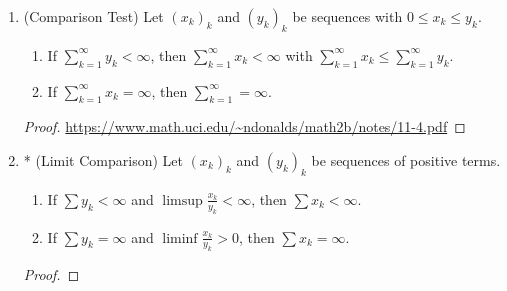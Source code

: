 \begin{enumerate}[label = (\arabic*)]
        \item (Comparison Test) Let $(x_k)_k$ and $(y_k)_k$ be sequences with $0 \leq x_k \leq y_k$.
            \begin{enumerate}[label = (\roman*)]
                \item If $\sum_{k=1}^\infty y_k < \infty$, then $\sum_{k = 1}^\infty x_k < \infty$ with $\sum_{k = 1}^\infty x_k \leq \sum_{k = 1}^\infty y_k$.
                \item If $\sum_{k = 1}^\infty x_k = \infty$, then $\sum_{k=1}^\infty = \infty$.
            \end{enumerate}
            {\color{red} \begin{proof}
                \url{https://www.math.uci.edu/~ndonalds/math2b/notes/11-4.pdf}
            \end{proof}}
        
        \item * (Limit Comparison) Let $(x_k)_k$ and $(y_k)_k$ be sequences of positive terms.
            \begin{enumerate}[label = (\roman*)]
                \item If $\sum y_k < \infty$ and $\limsup \frac{x_k}{y_k} < \infty$, then $\sum x_k < \infty$.
                \item If $\sum y_k = \infty$ and $\liminf \frac{x_k}{y_k} > 0$, then $\sum x_k = \infty$.
            \end{enumerate}
            {\color{red} \begin{proof}
                
            \end{proof}}
    \end{enumerate}